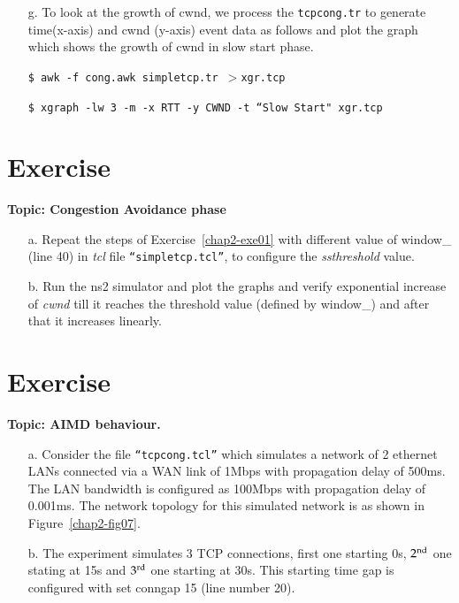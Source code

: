 \begin{multicols}{2}
\begin{itemize}
\item[g.] To look at the growth of cwnd, we process the \texttt{tcpcong.tr} to generate time(x-axis) and cwnd (y-axis) event data as follows and plot the graph \cite{art2-key15} which shows the growth of cwnd in slow start phase.

\texttt{\$  awk -f cong.awk simpletcp.tr $>$xgr.tcp}

\texttt{\$ xgraph -lw 3 -m -x RTT -y CWND -t ``Slow Start" xgr.tcp}
\end{itemize}

\section{Exercise}\label{chap2-exe02}

\textbf{Topic: Congestion Avoidance phase}
\begin{itemize}

\item[a.] Repeat the steps of Exercise~\ref{chap2-exe01} with different value of window\_ (line 40) in \textit{tcl} file \texttt{“simpletcp.tcl”}, to configure the \textit{ssthreshold} value.

\item[b.] Run the ns2 simulator and plot the graphs and verify  exponential increase of \textit{cwnd} till it reaches the threshold value (defined by window\_) and after that it increases linearly.
\end{itemize}

\section{Exercise}\label{chap2-exe03}

\textbf{Topic: AIMD behaviour.}

\begin{itemize}

\item[a.] Consider the file \texttt{“tcpcong.tcl”} which simulates a network of 2 ethernet LANs connected via a WAN link of 1Mbps with propagation delay of 500ms. The LAN bandwidth is configured as 100Mbps with propagation delay of 0.001ms. The network topology for this simulated network is as shown in Figure~\ref{chap2-fig07}.

\item[b.] The experiment simulates 3 TCP connections, first one starting 0s, ${\rm 2}^{\text{nd}}$ one stating at 15s and ${\rm 3}^{\text{rd}}$ one starting at 30s. This starting time gap is configured with set conngap 15 (line number 20).


\end{itemize}
\end{multicols}
